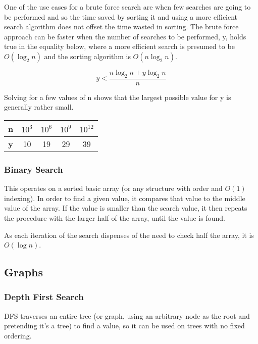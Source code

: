 \documentclass[]{article}
\begin{document}
One of the use cases for a brute force search are when few searches are going to be performed and so the time saved by sorting it and using a more efficient search algorithm does not offset the time wasted in sorting. The brute force approach can be faster when the number of searches to be performed, y, holds true in the equality below, where a more efficient search is presumed to be $O(\log_{2}{n})$ and the sorting algorithm is $O(n\log_{2}{n})$.

\[y < \frac{n\log_{2}{n} + y\log_{2}{n}}{n}\]

Solving for a few values of n shows that the largest possible value for y is generally rather small.

\begin{table}[h]
	\centering
\begin{tabular}{|c|c|c|c|c|}
	\hline \textbf {n} & $10^3$ & $10^6$ & $10^9$ & $10^{12}$ \\
	\hline \textbf{y} & 10 & 19 & 29 & 39 \\
	\hline 
\end{tabular}
\end{table}

\subsubsection{Binary Search}

This operates on a sorted basic array (or any structure with order and $O(1)$ indexing). In order to find a given value, it compares that value to the middle value of the array. If the value is smaller than the search value, it then repeats the procedure with the larger half of the array, until the value is found.

As each iteration of the search dispenses of the need to check half the array, it is $O(\log{n})$.

\pagebreak

\subsection{Graphs}

\subsubsection{Depth First Search}

DFS traverses an entire tree (or graph, using an arbitrary node as the root and pretending it's a tree) to find a value, so it can be used on trees with no fixed ordering.
\end{document}
